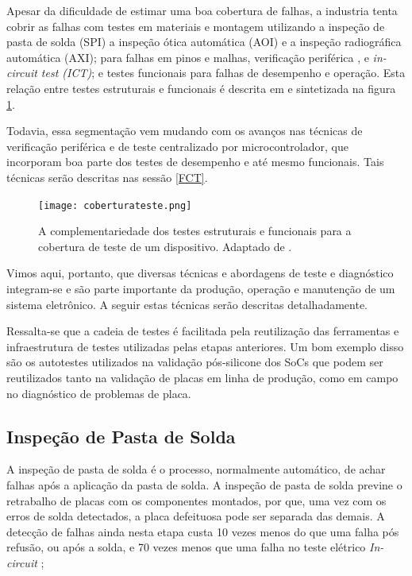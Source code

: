 Apesar da dificuldade de estimar uma boa cobertura de falhas, a industria tenta cobrir as falhas com testes em materiais e montagem utilizando a inspeção de pasta de solda (SPI) a inspeção ótica automática (AOI) e a inspeção radiográfica automática (AXI); para falhas em pinos e malhas, verificação periférica \citet{ieee11491yr2013}, e \textit{in-circuit test (ICT)}; e testes funcionais para falhas de desempenho e operação. Esta relação entre testes estruturais e funcionais é descrita em \citet{thomaswenzelenricozimmermann2016} e sintetizada na figura \ref{fig:cobertura}. 

Todavia, essa segmentação vem mudando com os avanços nas técnicas de verificação periférica e de teste centralizado por microcontrolador, que incorporam boa parte dos testes de desempenho e até mesmo funcionais. Tais técnicas serão descritas nas sessão \ref{FCT}.

\begin{figure}[ht]
    \centering
    \texttt{[image: coberturateste.png]}
    \caption{A complementariedade dos testes estruturais e funcionais para a cobertura de teste de um dispositivo. Adaptado de \cite{thomaswenzelenricozimmermann2016}.}
    \label{fig:cobertura}
\end{figure}

Vimos aqui, portanto, que diversas técnicas e abordagens de teste e diagnóstico integram-se e são parte importante da produção, operação e manutenção de um sistema eletrônico. A seguir estas técnicas serão descritas detalhadamente. 

Ressalta-se que a cadeia de testes é facilitada pela reutilização das ferramentas e infraestrutura de testes utilizadas pelas etapas anteriores. Um bom exemplo disso são os autotestes utilizados na validação pós-silicone dos SoCs que podem ser reutilizados tanto na validação de placas em linha de produção, como em campo no diagnóstico de problemas de placa.

\subsection{Inspeção de Pasta de Solda}

A inspeção de pasta de solda é o processo, normalmente automático, de achar falhas após a aplicação da pasta de solda. A inspeção de pasta de solda previne o retrabalho de placas com os componentes montados, por que, uma vez com os erros de solda detectados, a placa defeituosa pode ser separada das demais. A detecção de falhas ainda nesta etapa custa 10 vezes menos do que uma falha pós refusão, ou após a solda, e 70 vezes menos que uma falha no teste elétrico \textit{In-circuit} \citep{owen2000process};

